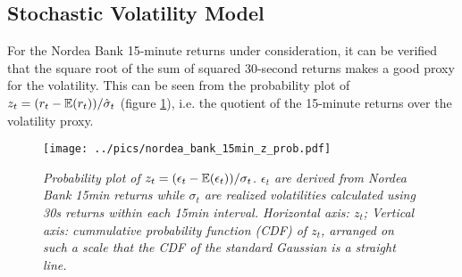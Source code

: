 \subsection{Stochastic Volatility Model}\label{sec:nordea_15min_arima}
For the Nordea Bank 15-minute returns under consideration, it can be
verified that the square root of the sum of squared 30-second returns
makes a good proxy for the volatility. This can be seen from the
probability plot of $z_t = (r_t - \mathbb{E}(r_t))/\hat{\sigma}_t$ (figure
\ref{fig:nordea_bank_15min_z_prob}), i.e. the quotient of the 
15-minute returns over the volatility proxy.
\begin{figure}[htb!]
  \centering
    \texttt{[image: ../pics/nordea\_bank\_15min\_z\_prob.pdf]}
  \caption{\small \it{Probability plot of $z_t =
      (\epsilon_t-\mathbb{E}(\epsilon_t))/\sigma_t$. $\epsilon_t$ are derived
      from Nordea Bank 15min returns while $\sigma_t$ are realized
      volatilities calculated
      using 30s returns within each 15min interval. Horizontal axis:
      $z_t$}; Vertical axis: cummulative probability function (CDF) of
    $z_t$, arranged on such a scale that the CDF of the standard
    Gaussian is a straight line.}
  \label{fig:nordea_bank_15min_z_prob}
\end{figure}


